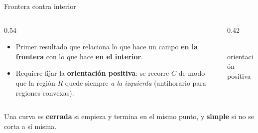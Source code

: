 \documentclass[11pt,aspectratio=169]{beamer}
\begin{document}
\begin{frame}{Frontera contra interior}
  \begin{columns}
    \begin{column}{0.54\textwidth}
      \begin{itemize}
        \item Primer resultado que relaciona lo que hace un campo \textbf{en la frontera} con lo que hace \textbf{en el interior}.
        \pause
        \item Requiere fijar la \textbf{orientación positiva}: se recorre $C$ de modo que la región $R$ quede siempre \emph{a la izquierda} (antihorario para regiones convexas).
      \end{itemize}
    \end{column}
    \begin{column}{0.42\textwidth}
      \centering
      \\[2pt]
      {\footnotesize\color{gray60} orientación positiva}
    \end{column}
  \end{columns}
  \vspace{4pt}
  \pause
  \begin{center}\small\color{gray60}
  Una curva es \textbf{cerrada} si empieza y termina en el mismo punto, y \textbf{simple} si no se corta a sí misma.
  \end{center}
\end{frame}
\end{document}
